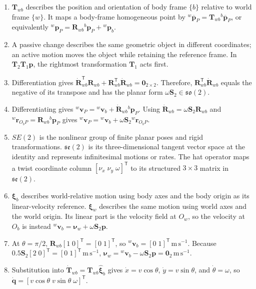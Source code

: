 \documentclass[
  australian,
  12pt,
  letterpaper,
  DIV=11,
  numbers=noendperiod,
  twoside]{scrreprt}
\providecommand{\tightlist}{%
  \setlength{\itemsep}{0pt}\setlength{\parskip}{0pt}}
\begin{document}
\begin{enumerate}
\def\labelenumi{\arabic{enumi}.}
\tightlist
\item
  \(\mathbf T_{wb}\) describes the position and orientation of body
  frame \(\{b\}\) relative to world frame \(\{w\}\). It maps a
  body-frame homogeneous point by
  \({}^w\overline{\mathbf p}_P=\mathbf T_{wb}{}^b\overline{\mathbf p}_P\),
  or equivalently
  \({}^w\mathbf p_P=\mathbf R_{wb}{}^b\mathbf p_P+{}^w\mathbf p_b\).
\item
  A passive change describes the same geometric object in different
  coordinates; an active motion moves the object while retaining the
  reference frame. In \(\mathbf T_2\mathbf T_1\mathbf p\), the rightmost
  transformation \(\mathbf T_1\) acts first.
\item
  Differentiation gives
  \(\dot{\mathbf R}_{wb}^\mathsf T\mathbf R_{wb}+\mathbf R_{wb}^\mathsf T\dot{\mathbf R}_{wb}=\mathbf 0_{2\times2}\).
  Therefore, \(\mathbf R_{wb}^\mathsf T\dot{\mathbf R}_{wb}\) equals the
  negative of its transpose and has the planar form
  \(\omega\mathbf S_2\in\mathfrak{so}(2)\).
\item
  Differentiating gives
  \({}^w\mathbf v_P={}^w\mathbf v_b+\dot{\mathbf R}_{wb}{}^b\mathbf p_P\).
  Using \(\dot{\mathbf R}_{wb}=\omega\mathbf S_2\mathbf R_{wb}\) and
  \({}^w\mathbf r_{O_bP}=\mathbf R_{wb}{}^b\mathbf p_P\) gives
  \({}^w\mathbf v_P={}^w\mathbf v_b+\omega\mathbf S_2{}^w\mathbf r_{O_bP}\).
\item
  \(SE(2)\) is the nonlinear group of finite planar poses and rigid
  transformations. \(\mathfrak{se}(2)\) is its three-dimensional tangent
  vector space at the identity and represents infinitesimal motions or
  rates. The hat operator maps a twist coordinate column
  \([\nu_x\;\nu_y\;\omega]^\mathsf T\) to its structured \(3\times3\)
  matrix in \(\mathfrak{se}(2)\).
\item
  \(\boldsymbol\xi_b\) describes world-relative motion using body axes
  and the body origin as its linear-velocity reference.
  \(\boldsymbol\xi_w\) describes the same motion using world axes and
  the world origin. Its linear part is the velocity field at \(O_w\), so
  the velocity at \(O_b\) is instead
  \({}^w\mathbf v_b=\boldsymbol\nu_w+\omega\mathbf S_2\mathbf p\).
\item
  At \(\theta=\pi/2\),
  \(\mathbf R_{wb}[1\;0]^\mathsf T=[0\;1]^\mathsf T\), so
  \({}^w\mathbf v_b=[0\;1]^\mathsf T\,\mathrm{m\,s^{-1}}\). Because
  \(0.5\mathbf S_2[2\;0]^\mathsf T=[0\;1]^\mathsf T\,\mathrm{m\,s^{-1}}\),
  \(\boldsymbol\nu_w={}^w\mathbf v_b-\omega\mathbf S_2\mathbf p=\mathbf 0_2\,\mathrm{m\,s^{-1}}\).
\item
  Substitution into
  \(\dot{\mathbf T}_{wb}=\mathbf T_{wb}\widehat{\boldsymbol\xi}_b\)
  gives \(\dot x=v\cos\theta\), \(\dot y=v\sin\theta\), and
  \(\dot\theta=\omega\), so
  \(\dot{\mathbf q}=[v\cos\theta\;v\sin\theta\;\omega]^\mathsf T\).
\end{enumerate}
\end{document}
